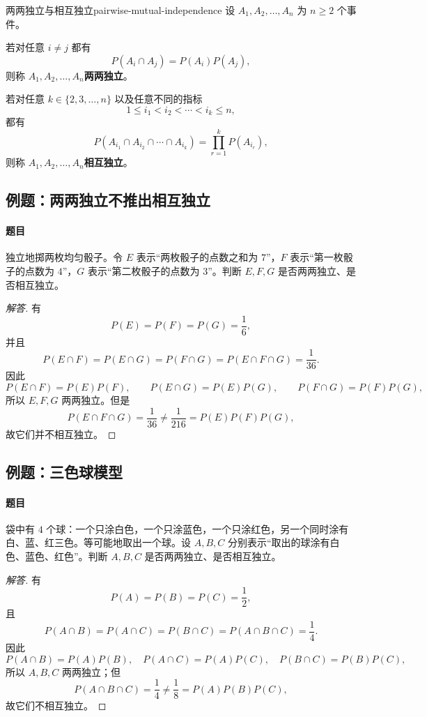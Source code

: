\begin{mydefinition}{两两独立与相互独立}{pairwise-mutual-independence}
	设 $A_1,A_2,\ldots,A_n$ 为 $n\geq2$ 个事件。

	若对任意 $i\ne j$ 都有
	\[
	P(A_i\cap A_j)=P(A_i)P(A_j),
	\]
	则称 $A_1,A_2,\ldots,A_n$\textbf{两两独立}。

	若对任意 $k\in\{2,3,\ldots,n\}$ 以及任意不同的指标
	\[
	1\leq i_1<i_2<\cdots<i_k\leq n,
	\]
	都有
	\[
	P(A_{i_1}\cap A_{i_2}\cap\cdots\cap A_{i_k})
	=\prod_{r=1}^{k}P(A_{i_r}),
	\]
	则称 $A_1,A_2,\ldots,A_n$\textbf{相互独立}。
\end{mydefinition}

\subsection{例题：两两独立不推出相互独立}\label{note:c1:e25}
\paragraph{题目}
独立地掷两枚均匀骰子。令 $E$ 表示“两枚骰子的点数之和为 $7$”，$F$ 表示“第一枚骰子的点数为 $4$”，$G$ 表示“第二枚骰子的点数为 $3$”。判断 $E,F,G$ 是否两两独立、是否相互独立。

\begin{proof}[解答]
有
\[
P(E)=P(F)=P(G)=\frac16,
\]
并且
\[
P(E\cap F)=P(E\cap G)=P(F\cap G)=P(E\cap F\cap G)=\frac1{36}.
\]
因此
\[
P(E\cap F)=P(E)P(F),
\qquad
P(E\cap G)=P(E)P(G),
\qquad
P(F\cap G)=P(F)P(G),
\]
所以 $E,F,G$ 两两独立。但是
\[
P(E\cap F\cap G)=\frac1{36}
\ne\frac1{216}=P(E)P(F)P(G),
\]
故它们并不相互独立。
\end{proof}

\subsection{例题：三色球模型}\label{note:c1:e26}
\paragraph{题目}
袋中有 $4$ 个球：一个只涂白色，一个只涂蓝色，一个只涂红色，另一个同时涂有白、蓝、红三色。等可能地取出一个球。设 $A,B,C$ 分别表示“取出的球涂有白色、蓝色、红色”。判断 $A,B,C$ 是否两两独立、是否相互独立。

\begin{proof}[解答]
有
\[
P(A)=P(B)=P(C)=\frac12,
\]
且
\[
P(A\cap B)=P(A\cap C)=P(B\cap C)=P(A\cap B\cap C)=\frac14.
\]
因此
\[
P(A\cap B)=P(A)P(B),
\quad
P(A\cap C)=P(A)P(C),
\quad
P(B\cap C)=P(B)P(C),
\]
所以 $A,B,C$ 两两独立；但
\[
P(A\cap B\cap C)=\frac14
\ne\frac18=P(A)P(B)P(C),
\]
故它们不相互独立。
\end{proof}

